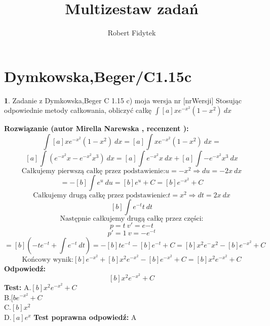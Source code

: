 \documentclass[12pt, a4paper]{article}
\title{Multizestaw zadań}
\author{Robert Fidytek}
\date{}
\theoremstyle{definition} %
\newtheorem{zad}{}
\newcommand{\kategoria}[1]{\section{#1}} %
\newcommand{\zadStart}[1]{\begin{zad}#1\newline} %
\newcommand{\zadStop}{\end{zad}}   %
\newcommand{\rozwStart}[2]{\noindent \textbf{Rozwiązanie (autor #1 , recenzent #2): }\newline} %
\newcommand{\odpStart}{\noindent \textbf{Odpowiedź:}\newline}    %
\newcommand{\odpStop}{\newline}                                             %
\newcommand{\testStart}{\noindent \textbf{Test:}\newline} %
\newcommand{\testStop}{\newline} %
\newcommand{\kluczStart}{\noindent \textbf{Test poprawna odpowiedź:}\newline} %
\newcommand{\kluczStop}{\newline} %
\begin{document}
\maketitle



\kategoria{Dymkowska,Beger/C1.15c}
\zadStart{Zadanie z Dymkowska,Beger C 1.15 c) moja wersja nr [nrWersji]}
Stosując odpowiednie metody całkowania, obliczyć całkę $\displaystyle \int [a]xe^{-x^2}(1-x^2) \ dx$
\zadStop
\rozwStart{Mirella Narewska}{}
$$\int [a]xe^{-x^2}(1-x^2) \ dx =[a]\int xe^{-x^2}(1-x^2) \ dx=$$
$$[a]\int \left( e^{-x^2}x-e^{-x^2}x^3\right) \ dx=[a]\int e^{-x^2}x \ dx +[a]\int -e^{-x^2}x^3 \ dx$$
$$\text{Całkujemy pierwszą całkę przez podstawienie:} u=-x^2\Rightarrow du=-2x  \ dx$$
$$=-[b]\int e^u \ du=[b] e^u +C=[b]e^{-x^2} +C$$
$$\text{Całkujemy drugą całkę przez podstawienie:} t=x^2 \Rightarrow dt=2x \ dx$$
$$[b]\int e^{-t}t \ dt$$
$$\text{Następnie całkujemy drugą całkę przez części:}$$
$$p=t \ v'=e{-t}$$
$$p'=1 \ v=-e^{-t}$$
$$=[b]\left( -te^{-t}+\int e^{-t}\ dt \right)=-[b]te^{-t}-[b]e^{-t}+C=[b]x^{2}e^-{x^2}-[b]e^{-x^2}+C$$
$$\text{Końcowy wynik:} [b]e^{-x^2} +[b]x^{2}e^{-x^2}-[b]e^{-x^2}+C=[b]x^{2}e^{-x^2}+C$$
\odpStart
$$[b]x^{2}e^{-x^2}+C$$
\odpStop
\testStart
A.$[b]x^{2}e^{-x^2}+C$
\\
B.$[be^{-x^2}+C$
\\
C.$[b]x^{2}$
\\
D.$[a]e^{x}$
\testStop
\kluczStart
A
\kluczStop
\end{document}
